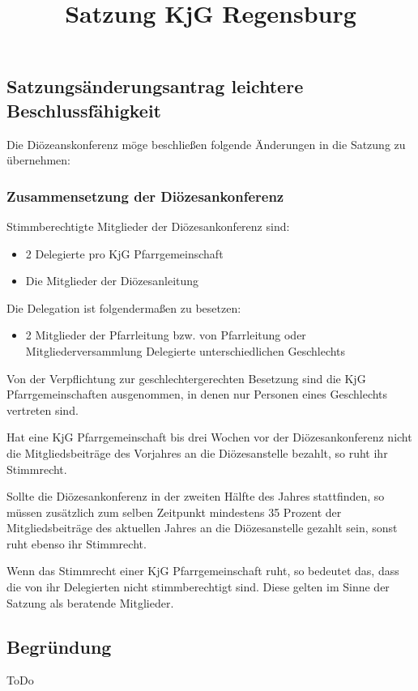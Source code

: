 \documentclass[12pt]{report}
\title{Satzung KjG Regensburg}
\author{}
\begin{document}
\subsection*{Satzungsänderungsantrag leichtere Beschlussfähigkeit}
\begin{flushleft}

Die Diözeanskonferenz möge beschließen folgende Änderungen in die Satzung zu übernehmen:

\subsubsection{Zusammensetzung der Diözesankonferenz}
Stimmberechtigte Mitglieder der Diözesankonferenz sind:
\begin{itemize}
  \item 2 Delegierte pro KjG Pfarrgemeinschaft
  \item Die Mitglieder der Diözesanleitung
\end{itemize}

Die Delegation ist folgendermaßen zu besetzen:
\begin{itemize}
  \item{ 2 Mitglieder der Pfarrleitung bzw. von Pfarrleitung oder Mitgliederversammlung
        Delegierte unterschiedlichen Geschlechts}
\end{itemize}

Von der Verpflichtung zur geschlechtergerechten Besetzung sind die KjG Pfarrgemeinschaften ausgenommen,
in denen nur Personen eines Geschlechts vertreten sind.

{\color{green}Hat eine KjG Pfarrgemeinschaft bis drei Wochen vor der Diözesankonferenz nicht die
Mitgliedsbeiträge des Vorjahres an die Diözesanstelle bezahlt, so ruht ihr Stimmrecht.

Sollte die Diözesankonferenz in der zweiten Hälfte des Jahres stattfinden,
so müssen zusätzlich zum selben Zeitpunkt mindestens 35 Prozent der Mitgliedsbeiträge des aktuellen Jahres an die Diözesanstelle
 gezahlt sein, sonst ruht ebenso ihr Stimmrecht.

Wenn das Stimmrecht einer KjG Pfarrgemeinschaft ruht, so bedeutet das, dass die von ihr Delegierten
nicht stimmberechtigt sind. Diese gelten im Sinne der Satzung als beratende Mitglieder.
\bigskip}

\subsection*{Begründung}
ToDo

\end{flushleft}
\end{document}
